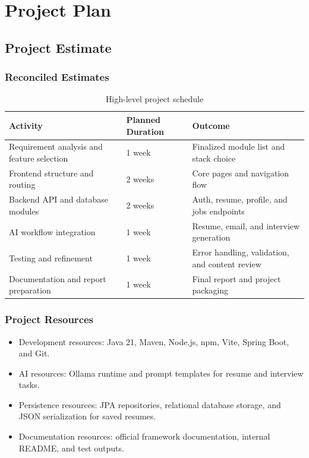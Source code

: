 \section{Project Plan}
\subsection{Project Estimate}
\subsubsection{Reconciled Estimates}
\begin{table}[H]
\centering
\caption{High-level project schedule}
\begin{tabular}{|p{5.0cm}|p{3.2cm}|p{3.2cm}|}
\hline
\textbf{Activity} & \textbf{Planned Duration} & \textbf{Outcome} \\
\hline
Requirement analysis and feature selection & 1 week & Finalized module list and stack choice \\
\hline
Frontend structure and routing & 2 weeks & Core pages and navigation flow \\
\hline
Backend API and database modules & 2 weeks & Auth, resume, profile, and jobs endpoints \\
\hline
AI workflow integration & 1 week & Resume, email, and interview generation \\
\hline
Testing and refinement & 1 week & Error handling, validation, and content review \\
\hline
Documentation and report preparation & 1 week & Final report and project packaging \\
\hline
\end{tabular}
\end{table}

\subsubsection{Project Resources}
\begin{itemize}
\item Development resources: Java 21, Maven, Node.js, npm, Vite, Spring Boot, and Git.
\item AI resources: Ollama runtime and prompt templates for resume and interview tasks.
\item Persistence resources: JPA repositories, relational database storage, and JSON serialization for saved resumes.
\item Documentation resources: official framework documentation, internal README, and test outputs.
\end{itemize}

